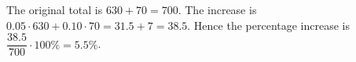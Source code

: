 The original total is $630+70=700$. The increase is $0.05\cdot630+0.10\cdot70=31.5+7=38.5$. Hence the percentage increase is $\dfrac{38.5}{700}\cdot100\%=\boxed{5.5\%}$.
